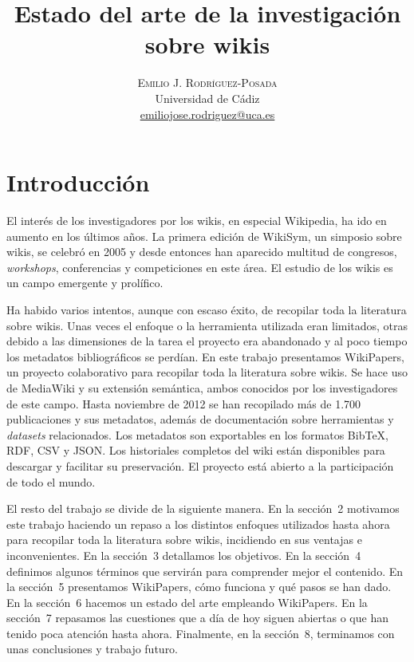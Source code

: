 \documentclass[11pt,onecolumn]{article}
\title{\vspace{-15mm}%
	\fontsize{24pt}{10pt}\selectfont
	\textbf{Estado del arte de la investigación sobre wikis}
	}
\author{%
	\large
	\textsc{Emilio J. Rodríguez-Posada} \\
	\normalsize	Universidad de Cádiz \\
	\normalsize	\href{mailto:emiliojose.rodriguez@uca.es}{emiliojose.rodriguez@uca.es}
	\vspace{-5mm}
	}
\date{}
\begin{document}
\maketitle

\begin{abstract}

\end{abstract}

\section{Introducción}




El interés de los investigadores por los wikis, en especial Wikipedia, ha ido en aumento en los últimos años. La primera edición de WikiSym, un simposio sobre wikis, se celebró en 2005 y desde entonces han aparecido multitud de congresos, \emph{workshops}, conferencias y competiciones en este área. El estudio de los wikis es un campo emergente y prolífico.

Ha habido varios intentos, aunque con escaso éxito, de recopilar toda la literatura sobre wikis. Unas veces el enfoque o la herramienta utilizada eran limitados, otras debido a las dimensiones de la tarea el proyecto era abandonado y al poco tiempo los metadatos bibliográficos se perdían. En este trabajo presentamos WikiPapers, un proyecto colaborativo para recopilar toda la literatura sobre wikis. Se hace uso de MediaWiki y su extensión semántica, ambos conocidos por los investigadores de este campo. Hasta noviembre de 2012 se han recopilado más de 1.700 publicaciones y sus metadatos, además de documentación sobre herramientas y \emph{datasets} relacionados. Los metadatos son exportables en los formatos BibTeX, RDF, CSV y JSON. Los historiales completos del wiki están disponibles para descargar y facilitar su preservación. El proyecto está abierto a la participación de todo el mundo.

El resto del trabajo se divide de la siguiente manera. En la sección~2 motivamos este trabajo haciendo un repaso a los distintos enfoques utilizados hasta ahora para recopilar toda la literatura sobre wikis, incidiendo en sus ventajas e inconvenientes. En la sección~3 detallamos los objetivos. En la sección~4 definimos algunos términos que servirán para comprender mejor el contenido. En la sección~5 presentamos WikiPapers, cómo funciona y qué pasos se han dado. En la sección~6 hacemos un estado del arte empleando WikiPapers. En la sección~7 repasamos las cuestiones que a día de hoy siguen abiertas o que han tenido poca atención hasta ahora. Finalmente, en la sección~8, terminamos con unas conclusiones y trabajo futuro.
\end{document}
